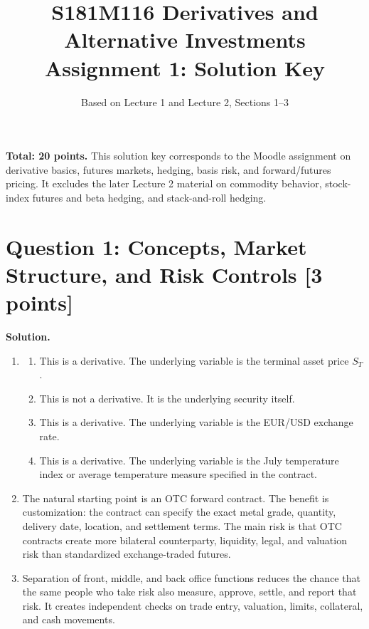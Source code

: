 \documentclass[11pt]{article}
\title{S181M116 Derivatives and Alternative Investments\\
Assignment 1: Solution Key}
\author{Based on Lecture 1 and Lecture 2, Sections 1--3}
\date{}
\newcommand{\pts}[1]{\hspace{0.35em}\textnormal{\textbf{[#1 points]}}}
\newcommand{\St}{S_T}
\newenvironment{solution}{\par\noindent\textbf{Solution.}\ }{\par}
\begin{document}
\maketitle

\textbf{Total: 20 points.} This solution key corresponds to the Moodle
assignment on derivative basics, futures markets, hedging, basis risk, and
forward/futures pricing. It excludes the later Lecture 2 material on commodity
behavior, stock-index futures and beta hedging, and stack-and-roll hedging.

\section*{Question 1: Concepts, Market Structure, and Risk Controls \pts{3}}

\begin{solution}
\begin{enumerate}
    \item
    \begin{enumerate}
        \item This is a derivative. The underlying variable is the terminal asset
        price $\St$.
        \item This is not a derivative. It is the underlying security itself.
        \item This is a derivative. The underlying variable is the EUR/USD
        exchange rate.
        \item This is a derivative. The underlying variable is the July
        temperature index or average temperature measure specified in the
        contract.
    \end{enumerate}

    \item The natural starting point is an OTC forward contract. The benefit is
    customization: the contract can specify the exact metal grade, quantity,
    delivery date, location, and settlement terms. The main risk is that OTC
    contracts create more bilateral counterparty, liquidity, legal, and
    valuation risk than standardized exchange-traded futures.

    \item Separation of front, middle, and back office functions reduces the
    chance that the same people who take risk also measure, approve, settle, and
    report that risk. It creates independent checks on trade entry, valuation,
    limits, collateral, and cash movements.
\end{enumerate}
\end{solution}
\end{document}
